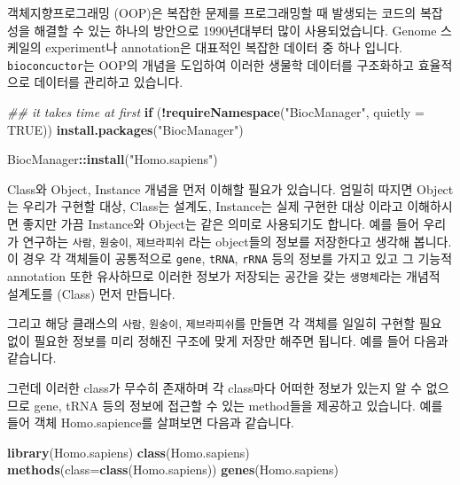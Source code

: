 \documentclass[
]{book}
\newenvironment{Shaded}{\begin{snugshade}}{\end{snugshade}}
\newcommand{\CommentTok}[1]{\textcolor[rgb]{0.56,0.35,0.01}{\textit{#1}}}
\newcommand{\ControlFlowTok}[1]{\textcolor[rgb]{0.13,0.29,0.53}{\textbf{#1}}}
\newcommand{\DataTypeTok}[1]{\textcolor[rgb]{0.13,0.29,0.53}{#1}}
\newcommand{\KeywordTok}[1]{\textcolor[rgb]{0.13,0.29,0.53}{\textbf{#1}}}
\newcommand{\NormalTok}[1]{#1}
\newcommand{\OperatorTok}[1]{\textcolor[rgb]{0.81,0.36,0.00}{\textbf{#1}}}
\newcommand{\OtherTok}[1]{\textcolor[rgb]{0.56,0.35,0.01}{#1}}
\newcommand{\StringTok}[1]{\textcolor[rgb]{0.31,0.60,0.02}{#1}}
\begin{document}
객체지향프로그래밍 (OOP)은 복잡한 문제를 프로그래밍할 때 발생되는 코드의 복잡성을 해결할 수 있는 하나의 방안으로 1990년대부터 많이 사용되었습니다. Genome 스케일의 experiment나 annotation은 대표적인 복잡한 데이터 중 하나 입니다. \texttt{bioconcuctor}는 OOP의 개념을 도입하여 이러한 생물학 데이터를 구조화하고 효율적으로 데이터를 관리하고 있습니다.

\begin{Shaded}
\begin{Highlighting}[]
\CommentTok{\#\# it takes time at first}
\ControlFlowTok{if}\NormalTok{ (}\OperatorTok{!}\KeywordTok{requireNamespace}\NormalTok{(}\StringTok{"BiocManager"}\NormalTok{, }\DataTypeTok{quietly =} \OtherTok{TRUE}\NormalTok{))}
    \KeywordTok{install.packages}\NormalTok{(}\StringTok{"BiocManager"}\NormalTok{)}

\NormalTok{BiocManager}\OperatorTok{::}\KeywordTok{install}\NormalTok{(}\StringTok{"Homo.sapiens"}\NormalTok{)}
\end{Highlighting}
\end{Shaded}

Class와 Object, Instance 개념을 먼저 이해할 필요가 있습니다. 엄밀히 따지면 Object는 우리가 구현할 대상, Class는 설계도, Instance는 실제 구현한 대상 이라고 이해하시면 좋지만 가끔 Instance와 Object는 같은 의미로 사용되기도 합니다. 예를 들어 우리가 연구하는 \texttt{사람}, \texttt{원숭이}, \texttt{제브라피쉬} 라는 object들의 정보를 저장한다고 생각해 봅니다. 이 경우 각 객체들이 공통적으로 \texttt{gene}, \texttt{tRNA}, \texttt{rRNA} 등의 정보를 가지고 있고 그 기능적 annotation 또한 유사하므로 이러한 정보가 저장되는 공간을 갖는 \texttt{생명체}라는 개념적 설계도를 (Class) 먼저 만듭니다.

그리고 해당 클래스의 \texttt{사람}, \texttt{원숭이}, \texttt{제브라피쉬}를 만들면 각 객체를 일일히 구현할 필요 없이 필요한 정보를 미리 정해진 구조에 맞게 저장만 해주면 됩니다. 예를 들어 다음과 같습니다.

그런데 이러한 class가 무수히 존재하며 각 class마다 어떠한 정보가 있는지 알 수 없으므로 gene, tRNA 등의 정보에 접근할 수 있는 method들을 제공하고 있습니다. 예를 들어 객체 Homo.sapience를 살펴보면 다음과 같습니다.

\begin{Shaded}
\begin{Highlighting}[]
\KeywordTok{library}\NormalTok{(Homo.sapiens)}
\KeywordTok{class}\NormalTok{(Homo.sapiens)}
\KeywordTok{methods}\NormalTok{(}\DataTypeTok{class=}\KeywordTok{class}\NormalTok{(Homo.sapiens))}
\KeywordTok{genes}\NormalTok{(Homo.sapiens)}
\end{Highlighting}
\end{Shaded}
\end{document}

